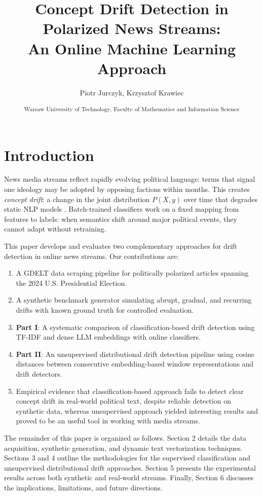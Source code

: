 \documentclass[
	a4paper,
	10pt,
	unnumberedsections,
	twoside,
]{LTJournalArticle}
\title{Concept Drift Detection in Polarized News Streams:\\
An Online Machine Learning Approach}
\author{Piotr Jurczyk, Krzysztof Krawiec}
\date{\footnotesize\textsuperscript{Warsaw University of Technology, Faculty of Mathematics and Information Science}}
\begin{document}
\maketitle


\section{Introduction}

News media streams reflect rapidly evolving political language: terms that signal one ideology may be adopted by opposing factions within months. This creates \textit{concept drift}: a change in the joint distribution $P(X, y)$ over time that degrades static NLP models \cite{gama2014survey}. Batch-trained classifiers work on a fixed mapping from features to labels: when semantics shift around major political events, they cannot adapt without retraining.

This paper develops and evaluates two complementary approaches for drift detection in online news streams. Our contributions are:
\begin{enumerate}
    \item A GDELT data scraping pipeline for politically polarized articles spanning the 2024 U.S. Presidential Election.
    \item A synthetic benchmark generator simulating abrupt, gradual, and recurring drifts with known ground truth for controlled evaluation.
    \item \textbf{Part I}: A systematic comparison of classification-based drift detection using TF-IDF and dense LLM embeddings with online classifiers.
    \item \textbf{Part II}: An unsupervised distributional drift detection pipeline using cosine distances between consecutive embedding-based window representations and drift detectors.
    \item Empirical evidence that classification-based approach fails to detect clear concept drift in real-world political text, despite reliable detection on synthetic data, whereas unsupervised approach yielded interesting results and proved to be an useful tool in working with media streams.
\end{enumerate}

The remainder of this paper is organized as follows. Section 2 details the data acquisition, synthetic generation, and dynamic text vectorization techniques. Sections 3 and 4 outline the methodologies for the supervised classification and unsupervised distributional drift approaches. Section 5 presents the experimental results across both synthetic and real-world streams. Finally, Section 6 discusses the implications, limitations, and future directions.
\end{document}
